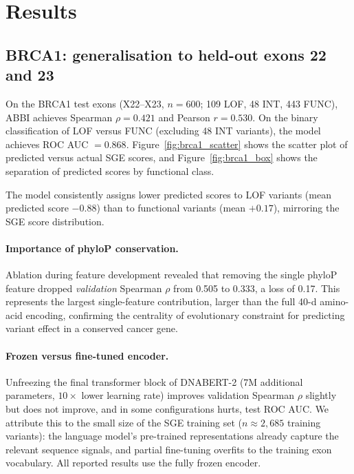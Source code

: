 \documentclass[12pt]{article}
\newcommand{\abbi}{\textsc{ABBI}}
\begin{document}
\section{Results}
\label{sec:results}

\subsection{BRCA1: generalisation to held-out exons 22 and 23}

On the BRCA1 test exons (X22--X23, $n = 600$; 109 LOF, 48 INT, 443 FUNC),
\abbi{} achieves Spearman $\rho = 0.421$ and Pearson $r = 0.530$.
On the binary classification of LOF versus FUNC (excluding 48 INT variants),
the model achieves ROC AUC $= 0.868$.
Figure~\ref{fig:brca1_scatter} shows the scatter plot of predicted versus actual
SGE scores, and Figure~\ref{fig:brca1_box} shows the separation of predicted
scores by functional class.

The model consistently assigns lower predicted scores to LOF variants
(mean predicted score $-0.88$) than to functional variants (mean $+0.17$),
mirroring the SGE score distribution.

\paragraph{Importance of phyloP conservation.}
Ablation during feature development revealed that removing the single phyloP feature
dropped \emph{validation} Spearman $\rho$ from 0.505 to 0.333, a loss of 0.17.
This represents the largest single-feature contribution, larger than the full 40-d
amino-acid encoding, confirming the centrality of evolutionary constraint for
predicting variant effect in a conserved cancer gene.

\paragraph{Frozen versus fine-tuned encoder.}
Unfreezing the final transformer block of DNABERT-2 (7M additional parameters, $10\times$
lower learning rate) improves validation Spearman $\rho$ slightly but does not
improve, and in some configurations hurts, test ROC AUC.
We attribute this to the small size of the SGE training set ($n \approx 2{,}685$
training variants): the language model's pre-trained representations already capture the
relevant sequence signals, and partial fine-tuning overfits to the training exon vocabulary.
All reported results use the fully frozen encoder.
\end{document}
